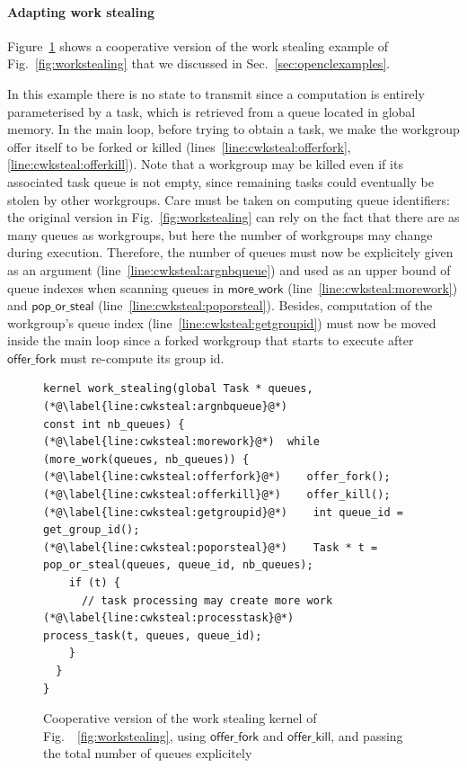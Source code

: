 \documentclass[numbers,nocopyrightspace,10pt]{sigplanconf}
\newcommand{\myfig}{Fig.~}
\newcommand{\myfiglong}{Figure~}
\newcommand{\mysec}{Sec.~}
\newcommand{\offerfork}{\mathsf{offer\_fork}}
\newcommand{\offerkill}{\mathsf{offer\_kill}}
\begin{document}
\paragraph{Adapting work stealing}

\myfiglong\ref{fig:workstealing-cooperative} shows a cooperative
version of the work stealing example of \myfig\ref{fig:workstealing} that we
discussed in \mysec\ref{sec:openclexamples}.

In this example there is no state to transmit since a computation is
entirely parameterised by a task, which is retrieved from a queue
located in global memory. In the main loop, before trying to obtain a
task, we make the workgroup offer itself to be forked or killed
(lines~\ref{line:cwksteal:offerfork},\ref{line:cwksteal:offerkill}). Note
that a workgroup may be killed even if its associated task queue is
not empty, since remaining tasks could eventually be stolen by other
workgroups.  Care must be taken on computing queue identifiers: the
original version in \myfig\ref{fig:workstealing} can rely on the fact
that there are as many queues as workgroups, but here the number of
workgroups may change during execution. Therefore, the number of
queues must now be explicitely given as an argument
(line~\ref{line:cwksteal:argnbqueue}) and used as an upper bound of
queue indexes when scanning queues in $\mathsf{more\_work}$
(line~\ref{line:cwksteal:morework}) and $\mathsf{pop\_or\_steal}$
(line~\ref{line:cwksteal:poporsteal}). Besides, computation of the
workgroup's queue index (line~\ref{line:cwksteal:getgroupid}) must now
be moved inside the main loop since a forked workgroup that starts to
execute after $\offerfork$ must re-compute its group id.

\begin{figure}

\begin{lstlisting}
kernel work_stealing(global Task * queues,
(*@\label{line:cwksteal:argnbqueue}@*)                     const int nb_queues) {
(*@\label{line:cwksteal:morework}@*)  while (more_work(queues, nb_queues)) {
(*@\label{line:cwksteal:offerfork}@*)    offer_fork();
(*@\label{line:cwksteal:offerkill}@*)    offer_kill();
(*@\label{line:cwksteal:getgroupid}@*)    int queue_id = get_group_id();
(*@\label{line:cwksteal:poporsteal}@*)    Task * t = pop_or_steal(queues, queue_id, nb_queues);
    if (t) {
      // task processing may create more work
(*@\label{line:cwksteal:processtask}@*)      process_task(t, queues, queue_id);
    }
  }
}
\end{lstlisting}

\caption{Cooperative version of the work stealing kernel of
  \myfig~\ref{fig:workstealing}, using $\offerfork$ and $\offerkill$,
  and passing the total number of queues
  explicitely}\label{fig:workstealing-cooperative}
\end{figure}
\end{document}
